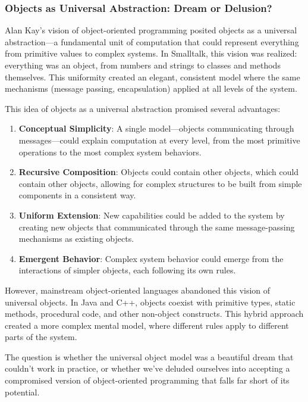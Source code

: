 \documentclass[11pt]{article}
\begin{document}
\subsubsection{Objects as Universal Abstraction: Dream or Delusion?}
\label{sec:org0260b73}

Alan Kay's vision of object-oriented programming posited objects as a universal abstraction—a fundamental unit of computation that could represent everything from primitive values to complex systems. In Smalltalk, this vision was realized: everything was an object, from numbers and strings to classes and methods themselves. This uniformity created an elegant, consistent model where the same mechanisms (message passing, encapsulation) applied at all levels of the system.

This idea of objects as a universal abstraction promised several advantages:

\begin{enumerate}
\item \textbf{Conceptual Simplicity}: A single model—objects communicating through messages—could explain computation at every level, from the most primitive operations to the most complex system behaviors.

\item \textbf{Recursive Composition}: Objects could contain other objects, which could contain other objects, allowing for complex structures to be built from simple components in a consistent way.

\item \textbf{Uniform Extension}: New capabilities could be added to the system by creating new objects that communicated through the same message-passing mechanisms as existing objects.

\item \textbf{Emergent Behavior}: Complex system behavior could emerge from the interactions of simpler objects, each following its own rules.
\end{enumerate}

However, mainstream object-oriented languages abandoned this vision of universal objects. In Java and C++, objects coexist with primitive types, static methods, procedural code, and other non-object constructs. This hybrid approach created a more complex mental model, where different rules apply to different parts of the system.

The question is whether the universal object model was a beautiful dream that couldn't work in practice, or whether we've deluded ourselves into accepting a compromised version of object-oriented programming that falls far short of its potential.
\end{document}
